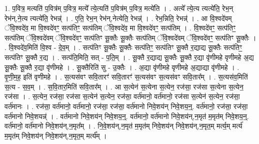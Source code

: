 \documentclass[17pt]{extarticle}
\begin{document}
1. प॒वित्र॒ मत्यति॑ प॒वित्र॑म् प॒वित्र॒ मत्ये᳚ त्ये॒त्यति॑ प॒वित्र॑म् प॒वित्र॒ मत्ये॑ति । . अत्ये᳚ त्ये॒त्य त्यत्ये॑ति॒ रेभ॒न् रेभ॑न्,ने॒त्य त्यत्ये॑ति॒ रेभन्न्॑ । . ए॒ति॒ रेभ॒न् रेभ॑न्,नेत्येति॒ रेभन्न्॑ । . रेभ॒न्निति॒ रेभन्न्॑ । . आ वि॒श्वदे॑वम् ॅवि॒श्वदे॑व॒ मा वि॒श्वदे॑वꣳ॒॒ सत्प॑तिꣳ॒॒ सत्प॑तिम् ॅवि॒श्वदे॑व॒ मा वि॒श्वदे॑वꣳ॒॒ सत्प॑तिम् । . वि॒श्वदे॑वꣳ॒॒ सत्प॑तिꣳ॒॒ सत्प॑तिम् ॅवि॒श्वदे॑वम् ॅवि॒श्वदे॑वꣳ॒॒ सत्प॑तिꣳ सू॒क्तैः सू॒क्तैः सत्प॑तिम् ॅवि॒श्वदे॑वम् ॅवि॒श्वदे॑वꣳ॒॒ सत्प॑तिꣳ सू॒क्तैः । . वि॒श्वदे॑व॒मिति॑ वि॒श्व - दे॒व॒म् । . सत्प॑तिꣳ सू॒क्तैः सू॒क्तैः सत्प॑तिꣳ॒॒ सत्प॑तिꣳ सू॒क्तै र॒द्याद्य सू॒क्तैः सत्प॑तिꣳ॒॒ सत्प॑तिꣳ सू॒क्तै र॒द्य । . सत्प॑ति॒मिति॒ सत् - प॒ति॒म् । . सू॒क्तै र॒द्याद्य सू॒क्तैः सू॒क्तै र॒द्या वृ॑णीमहे वृणीमहे अ॒द्य सू॒क्तैः सू॒क्तै र॒द्या वृ॑णीमहे । . सू॒क्तैरिति॑ सु - उ॒क्तैः । . अ॒द्या वृ॑णीमहे वृणीमहे अ॒द्याद्या वृ॑णीमहे । . वृ॒णी॒म॒ह॒ इति॑ वृणीमहे । . स॒त्यस॑वꣳ सवि॒तारꣳ॑ सवि॒तारꣳ॑ स॒त्यस॑वꣳ स॒त्यस॑वꣳ सवि॒तार᳚म् । . स॒त्यस॑व॒मिति॑ स॒त्य - स॒व॒म् । . स॒वि॒तार॒मिति॑ सवि॒तार᳚म् । . आ स॒त्येन॑ स॒त्येना स॒त्येन॒ रज॑सा॒ रज॑सा स॒त्येना स॒त्येन॒ रज॑सा । . स॒त्येन॒ रज॑सा॒ रज॑सा स॒त्येन॑ स॒त्येन॒ रज॑सा॒ वर्त॑मानो॒ वर्त॑मानो॒ रज॑सा स॒त्येन॑ स॒त्येन॒ रज॑सा॒ वर्त॑मानः । . रज॑सा॒ वर्त॑मानो॒ वर्त॑मानो॒ रज॑सा॒ रज॑सा॒ वर्त॑मानो निवे॒शय॑न् निवे॒शय॒न्॒. वर्त॑मानो॒ रज॑सा॒ 
रज॑सा॒ वर्त॑मानो निवे॒शयन्न्॑ । . वर्त॑मानो निवे॒शय॑न् निवे॒शय॒न्॒. वर्त॑मानो॒ वर्त॑मानो निवे॒शय॑न्,न॒मृत॑ म॒मृत॑म् निवे॒शय॒न्॒. वर्त॑मानो॒ वर्त॑मानो निवे॒शय॑न्,न॒मृत᳚म् । . नि॒वे॒शय॑न्,न॒मृत॑ म॒मृत॑म् निवे॒शय॑न् निवे॒शय॑न्,न॒मृत॒म् मर्त्य॒म् मर्त्य॑ म॒मृत॑म् निवे॒शय॑न् निवे॒शय॑न्,न॒मृत॒म् मर्त्य᳚म् । \newline
\end{document}
